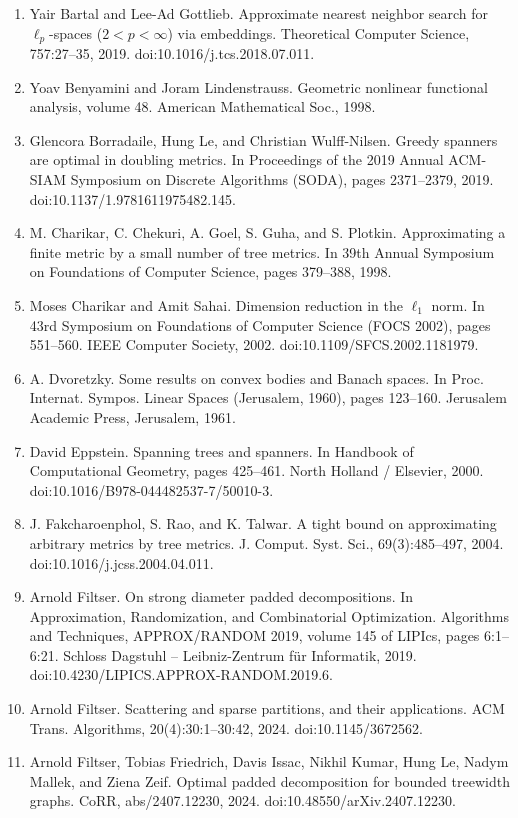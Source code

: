 \begin{enumerate}
\item  [10]  Yair Bartal and Lee-Ad Gottlieb.  Approximate nearest neighbor search for $\ell_{p}$-spaces ($2<p<\infty$) via embeddings.  Theoretical Computer Science, 757:27–35, 2019.  doi:10.1016/j.tcs.2018.07.011.  
\item  [11]  Yoav Benyamini and Joram Lindenstrauss.  Geometric nonlinear functional analysis, volume 48.  American Mathematical Soc., 1998.  
\item  [12]  Glencora Borradaile, Hung Le, and Christian Wulff-Nilsen.  Greedy spanners are optimal in doubling metrics.  In Proceedings of the 2019 Annual ACM-SIAM Symposium on Discrete Algorithms (SODA), pages 2371–2379, 2019.  doi:10.1137/1.9781611975482.145.  
\item  [13]  M. Charikar, C. Chekuri, A. Goel, S. Guha, and S. Plotkin.  Approximating a finite metric by a small number of tree metrics.  In 39th Annual Symposium on Foundations of Computer Science, pages 379–388, 1998.  
\item  [14]  Moses Charikar and Amit Sahai.  Dimension reduction in the $\ell_{1}$ norm.  In 43rd Symposium on Foundations of Computer Science (FOCS 2002), pages 551–560. IEEE Computer Society, 2002.  doi:10.1109/SFCS.2002.1181979.  
\item  [15]  A. Dvoretzky.  Some results on convex bodies and Banach spaces.  In Proc. Internat. Sympos. Linear Spaces (Jerusalem, 1960), pages 123–160. Jerusalem Academic Press, Jerusalem, 1961.  
\item  [16]  David Eppstein.  Spanning trees and spanners.  In Handbook of Computational Geometry, pages 425–461. North Holland / Elsevier, 2000.  doi:10.1016/B978-044482537-7/50010-3.  
\item  [17]  J. Fakcharoenphol, S. Rao, and K. Talwar.  A tight bound on approximating arbitrary metrics by tree metrics.  J. Comput. Syst. Sci., 69(3):485–497, 2004.  doi:10.1016/j.jcss.2004.04.011.  
\item  [18]  Arnold Filtser.  On strong diameter padded decompositions.  In Approximation, Randomization, and Combinatorial Optimization. Algorithms and Techniques, APPROX/RANDOM 2019, volume 145 of LIPIcs, pages 6:1–6:21. Schloss Dagstuhl – Leibniz-Zentrum für Informatik, 2019.  doi:10.4230/LIPICS.APPROX-RANDOM.2019.6.  
\item  [19]  Arnold Filtser.  Scattering and sparse partitions, and their applications.  ACM Trans. Algorithms, 20(4):30:1–30:42, 2024.  doi:10.1145/3672562.  
\item  [20]  Arnold Filtser, Tobias Friedrich, Davis Issac, Nikhil Kumar, Hung Le, Nadym Mallek, and Ziena Zeif.  Optimal padded decomposition for bounded treewidth graphs.  CoRR, abs/2407.12230, 2024.  doi:10.48550/arXiv.2407.12230.  

\end{enumerate}
